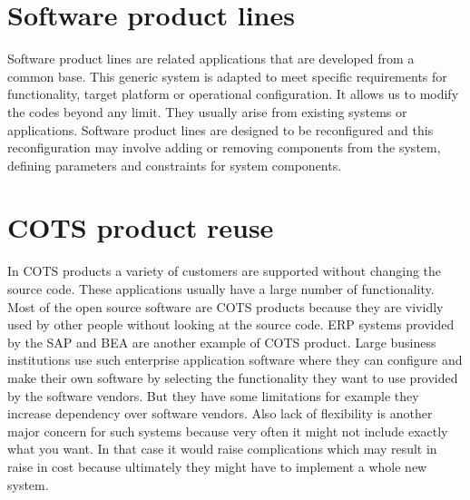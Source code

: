 \documentclass[dvips,12pt]{article}
\begin{document}
\section{Software product lines}
Software product lines are related applications that are developed from a common base. This generic system is adapted to meet specific requirements for functionality, target platform or operational configuration. It allows us to modify the codes beyond any limit. They usually arise from existing systems or applications. Software product lines are designed to be reconfigured and this reconfiguration may involve adding or removing components from the
system, defining parameters and constraints for system components.

\section{COTS product reuse}
In COTS products a variety of customers are supported without changing the source code. These applications usually have a large number of functionality. Most of the open source software are COTS products because they are vividly used by other people without looking at the source code. ERP systems provided by the SAP and BEA are another example of COTS product. Large business institutions use such enterprise application software where they can configure and make their own software by selecting the functionality they want to use provided by the software vendors. But they have some limitations for example they increase dependency over software vendors. Also lack of flexibility is another major concern for such systems because very often it might not include exactly what you want. In that case it would raise complications which may result in raise in cost because ultimately they might have to implement a whole new system.
\end{document}
